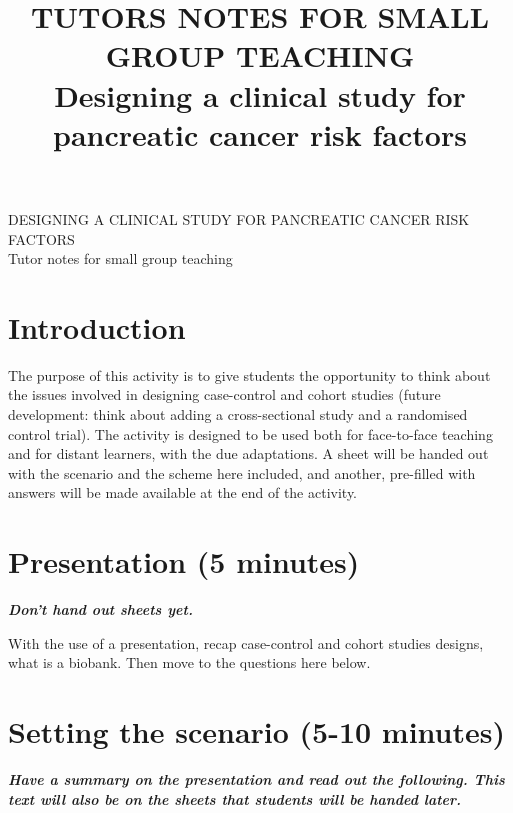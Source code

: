 \documentclass[a4paper,11pt]{scrartcl}
\title{TUTORS NOTES FOR SMALL GROUP TEACHING \\ Designing a clinical study for pancreatic cancer risk factors}
\date{}
\theoremstyle{plain}
\theoremstyle{remark}
\theoremstyle{definition}
\begin{document}
\begin{center}
{\LARGE DESIGNING A CLINICAL STUDY FOR PANCREATIC CANCER RISK FACTORS \\ \medskip Tutor notes for small group teaching}
\end{center}



\section{Introduction}
\label{sec:introduction}

The purpose of this activity is to give students the opportunity to think about the issues involved in designing case-control and cohort studies (future development: think about adding a cross-sectional study and a randomised control trial). The activity is designed to be used both for face-to-face teaching and for distant learners, with the due adaptations. A sheet will be handed out with the scenario and the scheme here included, and another, pre-filled with answers will be made available at the end of the activity. 

   
\section{Presentation (5 minutes)}

\textit{\textbf{Don't hand out sheets yet. }}

\medskip

With the use of a presentation, recap case-control and cohort studies designs, what is a biobank. Then move to the questions here below. 


\section{Setting the scenario (5-10 minutes)}

\textit{\textbf{Have a summary on the presentation and read out the following. This text will also be on the sheets that students will be handed later. }}
\medskip
\end{document}
